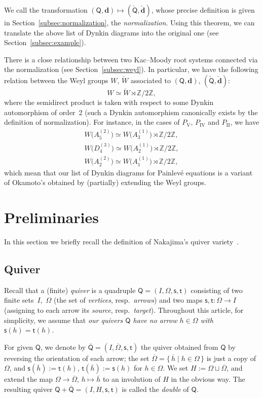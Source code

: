 \documentclass[pdftex]{sigma}
\numberwithin{equation}{section}
\theoremstyle{definition}
\newcommand{\secref}[1]{Section~\ref{#1}}
\newcommand{\Z}{\mathbb{Z}} %
\newcommand{\ov}{\overline}
\newcommand{\ved}{\mathbf{d}}
\newcommand{\vin}{\mathsf{t}} %
\newcommand{\vout}{\mathsf{s}} %
\newcommand{\QQ}{\mathsf{Q}} %
\begin{document}
We call the transformation
$(\QQ,\ved) \mapsto (\check{\QQ},\check{\ved})$,
whose precise def\/inition is given in \secref{subsec:normalization},
the {\em normalization}.
Using this theorem,
we can translate the above list of Dynkin diagrams into the original one
(see \secref{subsec:example}).

There is a close relationship between
two Kac--Moody root systems connected via the normalization
(see \secref{subsec:weyl}).
In particular, we have the following relation between
the Weyl groups $W$, $\check{W}$ associated to
$(\QQ,\ved)$, $(\check{\QQ},\check{\ved})$:
\[
W \simeq \check{W} \rtimes \Z/2\Z,
\]
where the semidirect product is taken with respect to
some Dynkin automorphism of order~2
(such a Dynkin automorphism canonically
exists by the def\/inition of normalization).
For instance,
in the cases of $P_\mathrm{V}$, $P_\mathrm{IV}$ and $P_\mathrm{II}$,
we have
\begin{gather*}
W\big(A_5^{(2)}\big) \simeq W\big(A_3^{(1)}\big) \rtimes \Z/2\Z, \\
W\big(D_4^{(3)}\big) \simeq W\big(A_2^{(1)}\big) \rtimes \Z/2\Z, \\
W\big(A_2^{(2)}\big) \simeq W\big(A_1^{(1)}\big) \rtimes \Z/2\Z,
\end{gather*}
which mean that our list of Dynkin diagrams for Painlev\'e equations
is a variant of Okamoto's obtained by (partially) extending the Weyl groups.


\section{Preliminaries}\label{sec:pre}

In this section
we brief\/ly recall the def\/inition of Nakajima's quiver variety~\cite{MR1302318}.

\subsection{Quiver}\label{subsec:quiver}

Recall that a (f\/inite) {\em quiver} is a
quadruple $\QQ=(I,\Omega,\vout,\vin)$ consisting of
two f\/inite sets~$I$,~$\Omega$
(the set of {\em vertices}, resp.\ {\em arrows})
and two maps
$\vout, \vin \colon \Omega \to I$
(assigning to each arrow
its {\em source}, resp.\ {\em target}).
Throughout this article, for simplicity,
we assume that {\em our quivers $\QQ$
have no arrow $h \in \Omega$ with $\vout(h)=\vin(h)$}.

For given $\QQ$, we denote by $\ov{\QQ}=(I,\ov{\Omega},\vout,\vin)$
the quiver obtained from $\QQ$ by reversing the orientation of each arrow;
the set $\ov{\Omega}=\{\, \ov h \mid h \in \Omega \,\}$
is just a copy of $\Omega$,
and $\vout(\ov h):=\vin(h)$, $\vin(\ov h):=\vout(h)$
for $h \in \Omega$.
We set $H := \Omega \sqcup \ov{\Omega}$,
and extend the map $\Omega \to \ov{\Omega}$, $h \mapsto \ov h$ to
an involution of $H$ in the obvious way.
The resulting quiver $\QQ + \ov{\QQ} =(I,H,\vout,\vin)$
is called the {\em double} of $\QQ$.
\end{document}
